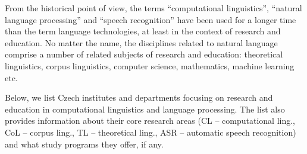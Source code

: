 \begin{multicols}{2}
From the historical point of view, the terms ``computational linguistics'', ``natural language processing'' and ``speech recognition'' have been used for a longer time than the term language technologies, at least in the context of research and education. No matter the name, the disciplines related to natural language comprise a number of related subjects of research and education: theoretical linguistics, corpus linguistics, computer science, mathematics, machine learning etc.

Below, we list Czech institutes and departments focusing on research and education in computational linguistics and language processing. The list also provides information about their core research areas (CL – computational ling., CoL – corpus ling., TL – theoretical ling., ASR – automatic speech recognition) and what study programs they offer, if any.


\end{multicols}
